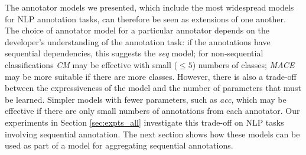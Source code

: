The annotator models  we presented, which include the most widespread models for NLP annotation tasks, can therefore be seen as extensions of one another.
The choice of annotator model for a particular annotator
 depends on the developer's understanding of the annotation task: 
 if the annotations have sequential dependencies, this suggests the \emph{seq} model;
for non-sequential classifications \emph{CM} may be effective with small ($\leq 5$) 
numbers of classes; \emph{MACE} may be more suitable if there are more classes. 
However, there is also a trade-off between the expressiveness of the model and the
number of parameters that must be learned. Simpler models with fewer parameters, such as \emph{acc}, which may be effective if there are only small numbers of annotations from each annotator. 
Our experiments in Section \ref{sec:expts_all} investigate this trade-off on NLP tasks involving sequential annotation.
The next section shows how these models can be used as part of 
a model for aggregating sequential annotations. 
